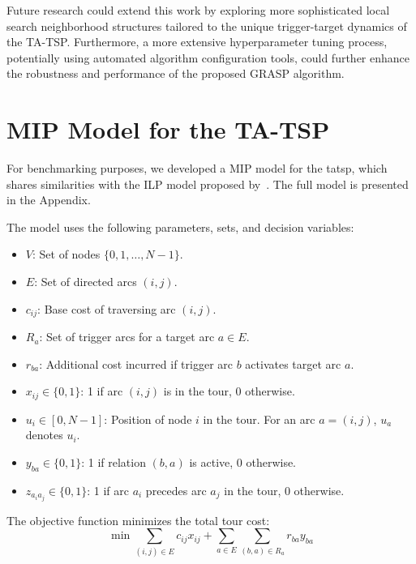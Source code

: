 \documentclass[twocolumn, switch]{article} %
\begin{document}
Future research could extend this work by exploring more sophisticated local search neighborhood structures tailored to the unique trigger-target dynamics of the TA-TSP. Furthermore, a more extensive hyperparameter tuning process, potentially using automated algorithm configuration tools, could further enhance the robustness and performance of the proposed GRASP algorithm.

\appendix
\section{MIP Model for the TA-TSP}
\label{sec:mip_model}
For benchmarking purposes, we developed a MIP model for the \gls{tatsp}, which shares similarities with the ILP model proposed by~\citet{Cerrone}.
The full model is presented in the Appendix.

The model uses the following parameters, sets, and decision variables:
\begin{itemize}
    \item $V$: Set of nodes $\{0, 1, \dots, N-1\}$.
    \item $E$: Set of directed arcs $(i,j)$.
    \item $c_{ij}$: Base cost of traversing arc $(i,j)$.
    \item $R_a$: Set of trigger arcs for a target arc $a \in E$.
    \item $r_{ba}$: Additional cost incurred if trigger arc $b$ activates target arc $a$.
    \item $x_{ij} \in \{0, 1\}$: 1 if arc $(i,j)$ is in the tour, 0 otherwise.
    \item $u_i \in [0, N-1]$: Position of node $i$ in the tour. For an arc $a=(i,j)$, $u_a$ denotes $u_i$.
    \item $y_{ba} \in \{0, 1\}$: 1 if relation $(b,a)$ is active, 0 otherwise.
    \item $z_{a_ia_j} \in \{0, 1\}$: 1 if arc $a_i$ precedes arc $a_j$ in the tour, 0 otherwise.
\end{itemize}

\footnotesize

The objective function minimizes the total tour cost:
\begin{equation} \label{eq:obj}
\min \sum_{(i,j) \in E} c_{ij} x_{ij} + \sum_{a \in E} \sum_{(b,a) \in R_a} r_{ba} y_{ba}
\end{equation}
\end{document}
